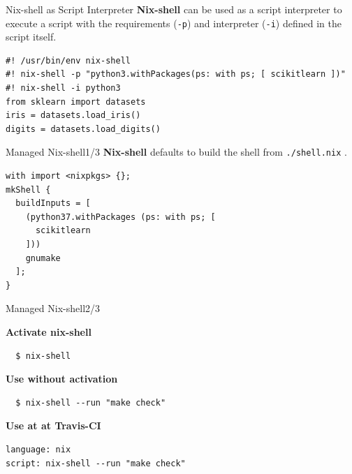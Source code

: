 \documentclass[12pt,aspectratio=169]{beamer}
\begin{document}

\begin{frame}[fragile]{Nix-shell as Script Interpreter}
  \textbf{Nix-shell} can be used as a script interpreter to execute a script with the requirements (\texttt{-p}) and interpreter (\texttt{-i}) defined in the script itself.
  \begin{verbatim}
#! /usr/bin/env nix-shell
#! nix-shell -p "python3.withPackages(ps: with ps; [ scikitlearn ])"
#! nix-shell -i python3
from sklearn import datasets
iris = datasets.load_iris()
digits = datasets.load_digits()
  \end{verbatim}
\end{frame}


\begin{frame}[fragile]{Managed Nix-shell\hfill1/3}
  \textbf{Nix-shell} defaults to build the shell from \texttt{./shell.nix} .
  \begin{verbatim}
with import <nixpkgs> {};
mkShell {
  buildInputs = [
    (python37.withPackages (ps: with ps; [
      scikitlearn
    ]))
    gnumake
  ];
}
  \end{verbatim}
\end{frame}


\begin{frame}[fragile]{Managed Nix-shell\hfill2/3}

  \textbf{Activate nix-shell}
  \begin{verbatim}
  $ nix-shell
  \end{verbatim}

  \textbf{Use without activation}
  \begin{verbatim}
  $ nix-shell --run "make check"
  \end{verbatim}

  \textbf{Use at at Travis-CI}
  \begin{verbatim}
language: nix
script: nix-shell --run "make check"
  \end{verbatim}

\end{frame}

\end{document}
